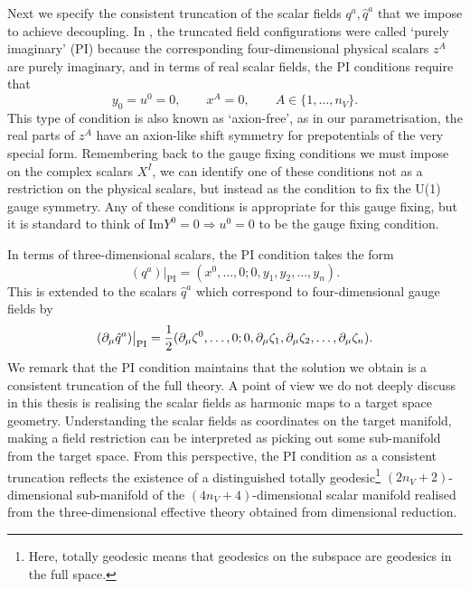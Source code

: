 Next we specify the consistent truncation of the scalar fields $q^a,\hat{q}^a$ that we impose to achieve decoupling. In \cite{Errington:2014bta}, the truncated field configurations were called `purely imaginary' (PI) because the corresponding four-dimensional physical scalars $z^A$ are purely imaginary, and in terms of real scalar fields, the PI conditions require that
\begin{equation*}
	y_0 = u^0 = 0, \qquad x^A = 0, \qquad A \in \{1,\ldots, n_V\}.
\end{equation*}
This type of condition is also known as `axion-free', as in our parametrisation, the real parts of $z^A$ have an axion-like shift symmetry for prepotentials of the very special form. Remembering back to the gauge fixing conditions we must impose on the complex scalars $X^I$, we can identify one of these conditions not as a restriction on the physical scalars, but instead as the condition to fix the U(1) gauge symmetry. Any of these conditions is appropriate for this gauge fixing, but it is standard to think of Im$Y^0 = 0 \Rightarrow u^0 = 0$ to be the gauge fixing condition.

In terms of three-dimensional scalars, the PI condition takes the form
\begin{equation}
\label{eq:PI1}
 (q^a) \big|_{\text{PI}} = (x^0,\ldots,0;0,y_1,y_2,\ldots,y_n).
\end{equation}
This is extended to the scalars $\hat{q}^a$ which correspond to four-dimensional gauge fields by
\begin{equation}
\label{eq:PI2}	
 (\partial_\mu \hat{q}^a) \big|_{\text{PI}} = \frac{1}{2} (\partial_\mu \zeta^0,\ldots,0;0,\partial_\mu \zeta_1,\partial_\mu \zeta_2,\ldots,\partial_\mu \zeta_n).
\end{equation}
We remark that the PI condition maintains that the solution we obtain is a consistent truncation of the full theory. A point of view we do not deeply discuss in this thesis is realising the scalar fields as harmonic maps to a target space geometry. Understanding the scalar fields as coordinates on the target manifold, making a field restriction can be interpreted as picking out some sub-manifold from the target space. From this perspective, the PI condition as a consistent truncation reflects the existence of a distinguished totally geodesic\footnote{Here, totally geodesic means that geodesics on the subspace are geodesics in the full space.} $(2n_V +2)$-dimensional sub-manifold of the $(4n_V + 4)$-dimensional scalar manifold realised from the three-dimensional effective theory obtained from dimensional reduction. 

